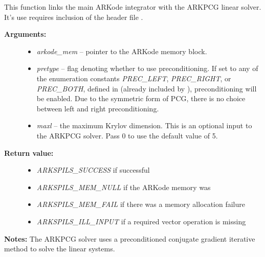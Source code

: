 \documentclass[letterpaper,10pt,english]{sphinxmanual}
\begin{document}

\begin{fulllineitems}
\label{c_interface/User_callable:c.ARKPcg}
This function links the main ARKode integrator with the ARKPCG
linear solver.  It's use requires inclusion of the header file
.
\begin{description}
\item[{\textbf{Arguments:}}] \leavevmode\begin{itemize}
\item {} 
\emph{arkode\_mem} -- pointer to the ARKode memory block.

\item {} 
\emph{pretype} -- flag denoting whether to use preconditioning.  If
set to any of the enumeration constants \emph{PREC\_LEFT}, \emph{PREC\_RIGHT},
or \emph{PREC\_BOTH}, defined in  (already
included by ), preconditioning will be
enabled. Due to the symmetric form of PCG, there is no choice
between left and right preconditioning.

\item {} 
\emph{maxl} -- the maximum Krylov dimension. This is an optional input
to the ARKPCG solver. Pass 0 to use the default value of 5.

\end{itemize}

\item[{\textbf{Return value:}}] \leavevmode\begin{itemize}
\item {} 
\emph{ARKSPILS\_SUCCESS} if successful

\item {} 
\emph{ARKSPILS\_MEM\_NULL}  if the ARKode memory was 

\item {} 
\emph{ARKSPILS\_MEM\_FAIL}  if there was a memory allocation failure

\item {} 
\emph{ARKSPILS\_ILL\_INPUT} if a required vector operation is missing

\end{itemize}

\end{description}

\textbf{Notes:} The ARKPCG solver uses a preconditioned conjugate
gradient iterative method to solve the linear systems.

\end{fulllineitems}
\end{document}
